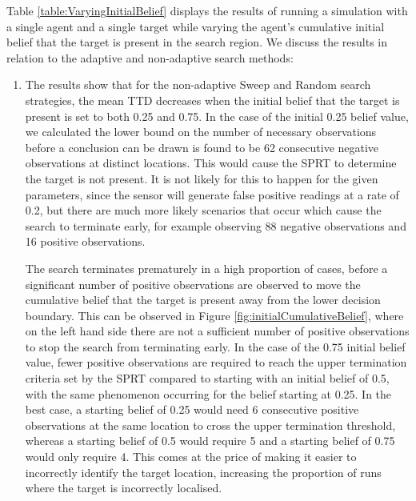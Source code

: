 Table \ref{table:VaryingInitialBelief} displays the results of running a simulation with a single agent and a single target while varying the agent's cumulative initial belief that the target is present in the search region. We discuss the results in relation to the adaptive and non-adaptive search methods:
\begin{enumerate}
    \item The results show that for the non-adaptive Sweep and Random search strategies, the mean TTD decreases when the initial belief that the target is present is set to both 0.25 and 0.75. In the case of the initial 0.25 belief value, we calculated the lower bound on the number of necessary observations before a conclusion can be drawn is found to be 62 consecutive negative observations at distinct locations. This would cause the SPRT to determine the target is not present. It is not likely for this to happen for the given parameters, since the sensor will generate false positive readings at a rate of 0.2, but there are much more likely scenarios that occur which cause the search to terminate early, for example observing 88 negative observations and 16 positive observations.
    \par The search terminates prematurely in a high proportion of cases, before a significant number of positive observations are observed to move the cumulative belief that the target is present away from the lower decision boundary. This can be observed in Figure \ref{fig:initialCumulativeBelief}, where on the left hand side there are not a sufficient number of positive observations to stop the search from terminating early. In the case of the 0.75 initial belief value, fewer positive observations are required to reach the upper termination criteria set by the SPRT compared to starting with an initial belief of 0.5, with the same phenomenon occurring for the belief starting at 0.25. In the best case, a starting belief of 0.25 would need 6 consecutive positive observations at the same location to cross the upper termination threshold, whereas a starting belief of 0.5 would  require 5 and a starting belief of 0.75 would only require 4. This comes at the price of making it easier to incorrectly identify the target location, increasing the proportion of runs where the target is incorrectly localised. 
    

\end{enumerate}
